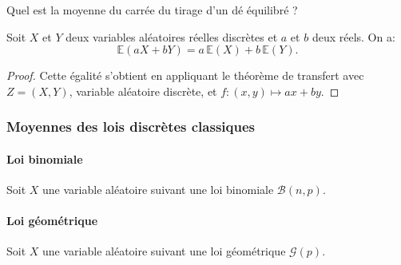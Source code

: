 \sld{\vfill\pagebreak[5]}%
\begin{exemple}
Quel est la moyenne du carrée du tirage d'un dé équilibré ?
 \pl{\rep{2cm}}
\end{exemple}

\begin{proposition}
Soit $X$ et $Y$ deux variables aléatoires réelles discrètes et $a$ et $b$ deux réels. On a:
\[
	\mathbb{E} (a X + b Y) = a \, \mathbb{E} (X) + b \,  \mathbb{E} (Y). 
\]
\end{proposition}
\begin{proof}
	Cette égalité s'obtient en appliquant le théorème de transfert avec $Z=(X,Y)$, variable aléatoire discrète, et $f:(x,y) \mapsto ax + by$.
	\pl{\rep{4cm}}
\end{proof}
\sld{\vfill\pagebreak[5]}%

\subsubsection{Moyennes des lois discrètes classiques}

\paragraph{Loi binomiale} Soit $X$ une variable aléatoire suivant une loi binomiale $\mathcal{B}(n, p)$. \pl{\rep{2cm}}

\paragraph{Loi géométrique} Soit $X$ une variable aléatoire suivant une loi géométrique $\mathcal{G}(p)$. \pl{\rep{4cm}}
\sld{\vfill\pagebreak[5]}%
